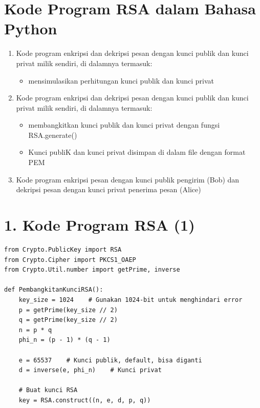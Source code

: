 \documentclass{article}
\begin{document}
\newpage


\section*{Kode Program RSA dalam Bahasa Python}

\begin{enumerate}
    \item Kode program enkripsi dan dekripsi pesan dengan kunci publik dan kunci privat milik sendiri, di dalamnya termasuk:
    \begin{itemize}
        \item mensimulasikan perhitungan kunci publik dan kunci privat
    \end{itemize}
    \item Kode program enkripsi dan dekripsi pesan dengan kunci publik dan kunci privat milik sendiri, di dalamnya termasuk:
    \begin{itemize}
        \item membangkitkan kunci publik dan kunci privat dengan fungsi RSA.generate()
        \item Kunci publiK dan kunci privat disimpan di dalam file dengan format PEM
    \end{itemize}
    \item Kode program enkripsi pesan dengan kunci publik pengirim (Bob) dan dekripsi pesan dengan kunci privat penerima pesan (Alice)
\end{enumerate}

\newpage


\section*{1. Kode Program RSA (1)}

\begin{verbatim}
from Crypto.PublicKey import RSA
from Crypto.Cipher import PKCS1_OAEP
from Crypto.Util.number import getPrime, inverse

def PembangkitanKunciRSA():
    key_size = 1024    # Gunakan 1024-bit untuk menghindari error
    p = getPrime(key_size // 2)
    q = getPrime(key_size // 2)
    n = p * q
    phi_n = (p - 1) * (q - 1)

    e = 65537    # Kunci publik, default, bisa diganti
    d = inverse(e, phi_n)    # Kunci privat

    # Buat kunci RSA
    key = RSA.construct((n, e, d, p, q))
\end{verbatim}
\end{document}
